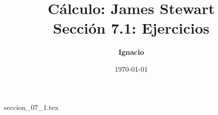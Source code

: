 \documentclass[11pt,spanish,oneside]{report}
\title{\textbf{Cálculo: James Stewart} \\ \Large Sección 7.1: Ejercicios}
\author{\textbf{Ignacio}}
\date{\today}
\begin{document}
\maketitle

{seccion_07_1.tex}
\end{document}

